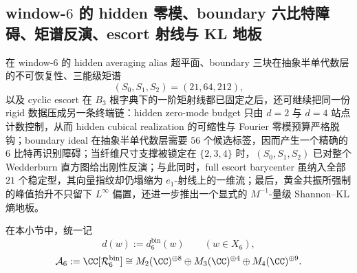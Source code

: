 \subsection{window-\texorpdfstring{$6$}{6} 的 hidden 零模、boundary 六比特障碍、矩谱反演、escort 射线与 KL 地板}\label{subsec:conclusion-window6-hidden-boundary-moment-escort-kl-floor}
在 window-\(6\) 的 hidden averaging alias 超平面、boundary 三块在抽象半单代数层的不可恢复性、三能级矩谱
\[
(S_0,S_1,S_2)=(21,64,212),
\]
以及 cyclic escort 在 \(B_3\) 根字典下的一阶矩射线都已固定之后，还可继续把同一份 rigid 数据压成另一条终端链：hidden zero-mode budget 只由 \(d=2\) 与 \(d=4\) 站点计数控制，从而 hidden cubical realization 的可缩性与 Fourier 零模预算严格脱钩；boundary ideal 在抽象半单代数层需要 \(56\) 个候选标签，因而产生一个精确的 \(6\) 比特再识别障碍；当纤维尺寸支撑被锁定在 \(\{2,3,4\}\) 时，\((S_0,S_1,S_2)\) 已对整个 Wedderburn 直方图给出刚性反演；与此同时，full escort barycenter 虽纳入全部 \(21\) 个稳定型，其向量指纹却仍塌缩为 \(e_1\)-射线上的一维流；最后，黄金共振所强制的峰值抬升不只留下 \(L^\infty\) 偏置，还进一步推出一个显式的 \(M^{-1}\)-量级 Shannon--KL 熵地板。

在本小节中，统一记
\[
d(w):=d_6^{\mathrm{bin}}(w)
\qquad (w\in X_6),
\]
\[
\mathcal A_6:=\CC[\mathcal R_6^{\mathrm{bin}}]
\cong
M_2(\CC)^{\oplus 8}\oplus M_3(\CC)^{\oplus 4}\oplus M_4(\CC)^{\oplus 9}.
\]

